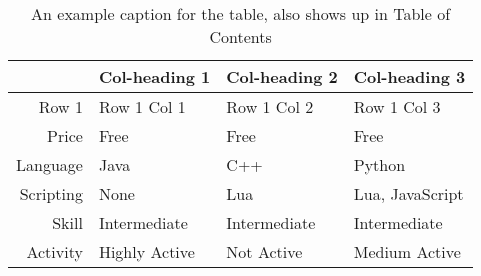 \begin{table}[h]
  \centering
    \begin{tabular}{r | p{4cm} p{4cm} p{4cm} }
    \toprule
     & %
      \multicolumn{1}{c}{\textbf{Col-heading 1}} &
      \multicolumn{1}{c}{\textbf{Col-heading 2}} &
      \multicolumn{1}{c}{\textbf{Col-heading 3}}
      \\
    \midrule
    Row 1 &
      Row 1 Col 1 &
      Row 1 Col 2 &
      Row 1 Col 3
      \\
    Price &
      Free &
      Free &
      Free
      \\
    Language &
      Java &
      C++ &
      Python
      \\
    Scripting &
      None &
      Lua &
      Lua, JavaScript
      \\
    Skill &
      Intermediate &
      Intermediate &
      Intermediate
      \\
    Activity &
      Highly Active &
      Not Active &
      Medium Active
      \\
    \bottomrule
    \end{tabular}
  \caption{An example caption for the table, also shows up in Table of Contents}
  \label{tab:example_1}
\end{table}